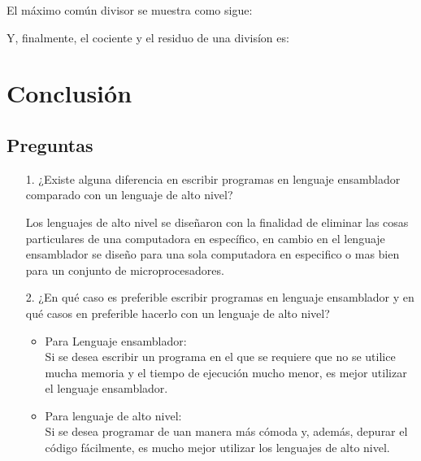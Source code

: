 \documentclass[12pt, letterpaper]{article}
\begin{document}
  El máximo común divisor se muestra como sigue:\vspace{.2cm}

  \vspace{.3cm}

  Y, finalmente, el cociente y el residuo de una divisíon es:\vspace{.2cm}

  \vspace{.3cm}

  \section{Conclusión}
    \subsection{Preguntas}

    \begin{itemize}
      \item[1.] ¿Existe alguna diferencia en escribir   programas en lenguaje ensamblador comparado con un lenguaje de alto nivel?\vspace{.2cm}

      Los lenguajes de alto nivel se diseñaron con la finalidad de eliminar las cosas particulares de una computadora en específico, en cambio en el lenguaje ensamblador se diseño para una sola computadora en especifico o mas bien para un conjunto de microprocesadores.

      \item[2.] ¿En qué caso es preferible escribir programas en lenguaje ensamblador y en qué casos en preferible hacerlo con un lenguaje de alto nivel?\vspace{.2cm}

      \begin{itemize}
        \item Para Lenguaje ensamblador: \\
              Si se desea escribir un programa en el que se requiere que no se utilice mucha memoria y el tiempo de ejecución mucho menor, es mejor utilizar el lenguaje ensamblador.
        \item Para lenguaje de alto nivel: \\
              Si se desea programar de uan manera más cómoda y, además, depurar el código fácilmente, es mucho mejor utilizar los lenguajes de alto nivel.
      \end{itemize}

    \end{itemize}



  
\end{document}
